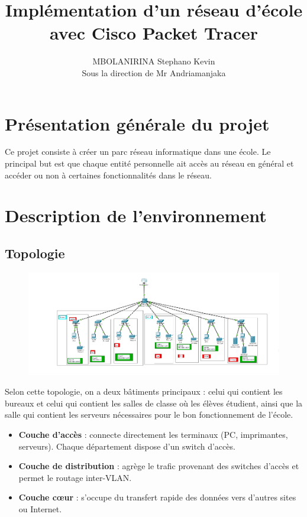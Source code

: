 \documentclass[a4paper,12pt]{article}
\title{Implémentation d’un réseau d’école avec Cisco Packet Tracer}
\author{MBOLANIRINA Stephano Kevin\\Sous la direction de Mr Andriamanjaka}
\date{}
\begin{document}
\maketitle
\newpage
\tableofcontents
\newpage

\section{Présentation générale du projet}
Ce projet consiste à créer un parc réseau informatique dans une école. Le principal but est que chaque entité personnelle ait accès au réseau en général et accéder ou non à certaines fonctionnalités dans le réseau.

\section{Description de l’environnement}

\subsection{Topologie}
\begin{figure}[H]
    \centering
    \includegraphics[width=1.2\textwidth]{CAPTURE/Top.png}
    \caption{}
    \label{fig:snort_install}
\end{figure}

Selon cette topologie, on a deux bâtiments principaux : celui qui contient les bureaux et celui qui contient les salles de classe où les élèves étudient, ainsi que la salle qui contient les serveurs nécessaires pour le bon fonctionnement de l’école.

\begin{itemize}
    \item \textbf{Couche d'accès} : connecte directement les terminaux (PC, imprimantes, serveurs). Chaque département dispose d’un switch d’accès.
    \item \textbf{Couche de distribution} : agrège le trafic provenant des switches d’accès et permet le routage inter-VLAN.
    \item \textbf{Couche cœur} : s’occupe du transfert rapide des données vers d'autres sites ou Internet.
\end{itemize}
\end{document}
